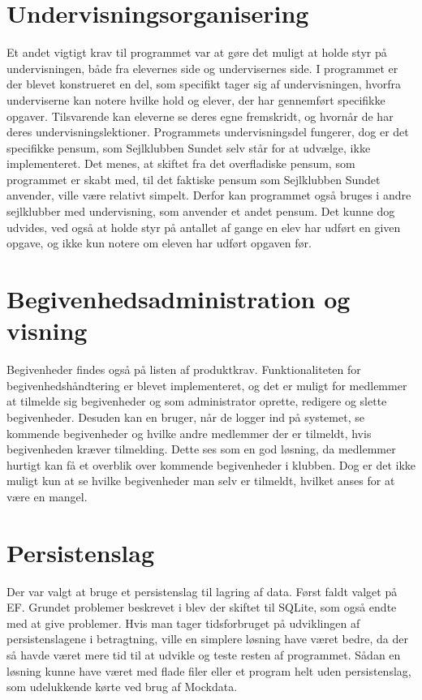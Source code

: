 \section*{Undervisningsorganisering}

Et andet vigtigt krav til programmet var at gøre det muligt at holde styr på undervisningen, både fra elevernes side og undervisernes side. 
I programmet er der blevet konstrueret en del, som specifikt tager sig af undervisningen, hvorfra underviserne kan notere hvilke hold og elever, der har gennemført specifikke opgaver.
Tilsvarende kan eleverne se deres egne fremskridt, og hvornår de har deres undervisningslektioner.
Programmets undervisningsdel fungerer, dog er det specifikke pensum, som Sejlklubben Sundet selv står for at udvælge, ikke implementeret. 
Det menes, at skiftet fra det overfladiske pensum, som programmet er skabt med, til det faktiske pensum som Sejlklubben Sundet anvender, ville være relativt simpelt. 
Derfor kan programmet også bruges i andre sejlklubber med undervisning, som anvender et andet pensum. 
Det kunne dog udvides, ved også at holde styr på antallet af gange en elev har udført en given opgave, og ikke kun notere om eleven har udført opgaven før.


\section*{Begivenhedsadministration og visning}

Begivenheder findes også på listen af produktkrav.
Funktionaliteten for begivenhedshåndtering er blevet implementeret, og det er muligt for medlemmer at tilmelde sig begivenheder og som administrator oprette, redigere og slette begivenheder. 
Desuden kan en bruger, når de logger ind på systemet, se kommende begivenheder og hvilke andre medlemmer der er tilmeldt, hvis begivenheden kræver tilmelding. 
Dette ses som en god løsning, da medlemmer hurtigt kan få et overblik over kommende begivenheder i klubben.
Dog er det ikke muligt kun at se hvilke begivenheder man selv er tilmeldt, hvilket anses for at være en mangel. 


\section*{Persistenslag}

Der var valgt at bruge et persistenslag til lagring af data. 
Først faldt valget på \acl{EF}. 
Grundet problemer beskrevet i  blev der skiftet til SQLite, som også endte med at give problemer. 
Hvis man tager tidsforbruget på udviklingen af persistenslagene i betragtning, ville en simplere løsning have været bedre, da der så havde været mere tid til at udvikle og teste resten af programmet.
Sådan en løsning kunne have været med flade filer eller et program helt uden persistenslag, som udelukkende kørte ved brug af Mockdata.  

